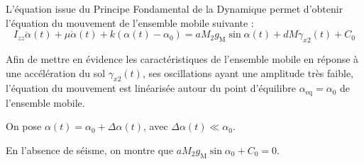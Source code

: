 %
%

L'équation issue du Principe Fondamental de la Dynamique permet d'obtenir l'équation du mouvement de l'ensemble mobile suivante :
$$I_{z z} \ddot{\alpha}(t)+\mu \dot{\alpha}(t)+k\left(\alpha(t)-\alpha_{0}\right)=a M_{2} g_{\mathrm{M}} \sin \alpha(t)+d M \gamma_{x 2}(t)+C_{0}
$$



Afin de mettre en évidence les caractéristiques de l'ensemble mobile en réponse à une accélération du sol $\gamma_{x 2}(t)$, ses oscillations ayant une amplitude très faible, l'équation du mouvement est linéarisée autour du point d'équilibre $\alpha_{\mathrm{eq}}=\alpha_{0}$ de l'ensemble mobile.

On pose $\alpha(t)=\alpha_{0}+\Delta \alpha(t)$, avec $\Delta \alpha(t) \ll \alpha_{0}$.


En l'absence de séisme, on montre que $a M_{2} g_{\mathrm{M}} \sin \alpha_{0}+C_{0}=0$.

